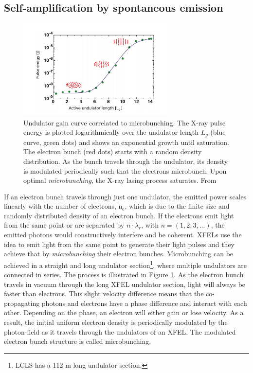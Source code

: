 \subsection{Self-amplification by spontaneous emission}\label{sec:sase}
\begin{figure}
	\centering
		\includegraphics[width=0.7\textwidth]{images/gain-length.JPG}
	\caption[Undulator gain curve correlated to microbunching.]{Undulator gain curve correlated to microbunching. The X-ray pulse energy is plotted logarithmically over the undulator length $L_{g}$ (blue curve, green dots) and shows an exponential growth until saturation. The electron bunch (red dots) starts with a random density distribution. As the bunch travels through the undulator, its density is modulated periodically such that the electrons microbunch. Upon optimal \textit{microbunching}, the X-ray lasing process saturates. From \citep{Rupp-2013-Thesis,Rupp-2016-Springer}}
	\label{fig:gain-length}
\end{figure}
If an electron bunch travels through just one undulator, the emitted power scales linearly with the number of electrons, n$_{\text{e}}$, which is due to the finite size and randomly distributed density of an electron bunch. If the electrons emit light from the same point or are separated by $n\cdot \lambda_{r}$, with $n=\left(1, 2, 3, ...\right)$, the emitted photons would constructively interfere and be coherent. XFELs use the idea to emit light from the same point to generate their light pulses and they achieve that by \textit{microbunching} their electron bunches. Microbunching can be achieved in a straight and long undulator section\footnote{LCLS has a 112 m long undulator section.}, where multiple undulators are connected in series. The process is illustrated in Figure \ref{fig:gain-length}. As the electron bunch travels in vacuum through the long XFEL undulator section, light will always be faster than electrons. This slight velocity difference means that the co-propagating photons and electrons have a phase difference and interact with each other. Depending on the phase, an electron will either gain or lose velocity. As a result, the initial uniform electron density is periodically modulated by the photon-field as it travels through the undulators of an XFEL. The modulated electron bunch structure is called microbunching.\\[1\baselineskip]
